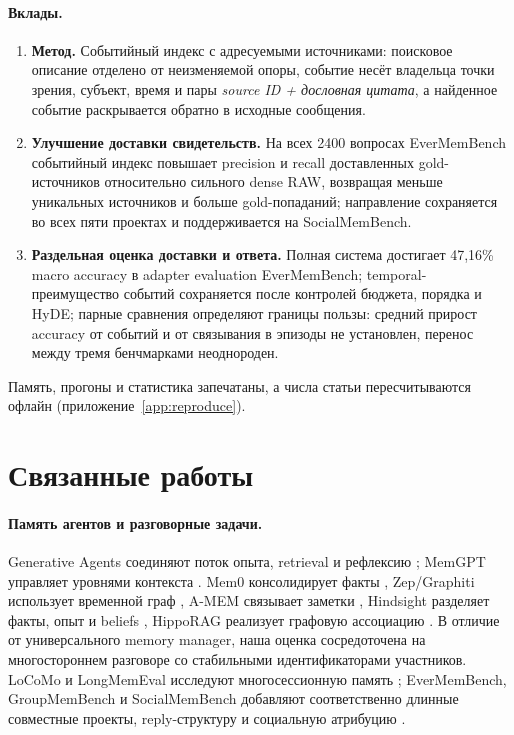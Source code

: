 \documentclass[11pt,a4paper]{article}
\begin{document}
\paragraph{Вклады.}
\begin{enumerate}
\item \textbf{Метод.} Событийный индекс с адресуемыми источниками: поисковое
описание отделено от неизменяемой опоры, событие несёт владельца точки зрения,
субъект, время и пары \emph{source ID + дословная цитата}, а найденное событие
раскрывается обратно в исходные сообщения.
\item \textbf{Улучшение доставки свидетельств.} На всех 2400 вопросах
EverMemBench событийный индекс повышает precision и recall доставленных
gold-источников относительно сильного dense RAW, возвращая меньше уникальных
источников и больше gold-попаданий; направление сохраняется во всех пяти проектах
и поддерживается на SocialMemBench.
\item \textbf{Раздельная оценка доставки и ответа.} Полная система достигает
47,16\% macro accuracy в adapter evaluation EverMemBench; temporal-преимущество
событий сохраняется после контролей бюджета, порядка и HyDE; парные сравнения
определяют границы пользы: средний прирост accuracy от событий и от связывания в
эпизоды не установлен, перенос между тремя бенчмарками неоднороден.
\end{enumerate}
Память, прогоны и статистика запечатаны, а числа статьи пересчитываются офлайн
(приложение~\ref{app:reproduce}).

\section{Связанные работы}

\paragraph{Память агентов и разговорные задачи.}
Generative Agents соединяют поток опыта, retrieval и рефлексию \citep{park2023};
MemGPT управляет уровнями контекста \citep{packer2023}. Mem0 консолидирует
факты \citep{chhikara2025mem0}, Zep/Graphiti использует временной граф
\citep{rasmussen2025zep}, A-MEM связывает заметки \citep{xu2025amem},
Hindsight разделяет факты, опыт и beliefs \citep{latimer2025hindsight},
HippoRAG реализует графовую ассоциацию \citep{gutierrez2024hipporag}.
В отличие от универсального memory manager, наша оценка сосредоточена на
многостороннем разговоре со стабильными идентификаторами участников.
LoCoMo и LongMemEval исследуют многосессионную память \citep{maharana2024,wu2024};
EverMemBench, GroupMemBench и SocialMemBench добавляют соответственно длинные
совместные проекты, reply-структуру и социальную атрибуцию
\citep{hu2026,yang2026,owolabi2026}.
\end{document}
